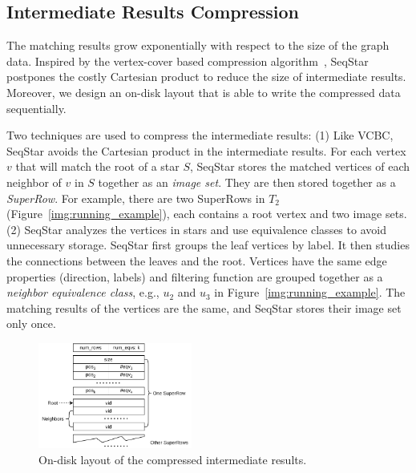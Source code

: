 \subsection{Intermediate Results Compression}\label{sec:match_compress}
The matching results grow exponentially with respect to the size of the graph data.
Inspired by the vertex-cover based compression algorithm~\cite{DBLP:journals/pvldb/QiaoZC17},
SeqStar postpones the costly Cartesian product to reduce the size of intermediate results.
Moreover, we design an on-disk layout that is able to write the compressed data sequentially.

Two techniques are used to compress the intermediate results:
(1) Like VCBC, SeqStar avoids the Cartesian product in the intermediate results.
For each vertex $v$ that will match the root of a star $S$,
SeqStar stores the matched vertices of each neighbor of $v$ in $S$ together as an \emph{image set}.
They are then stored together as a \emph{SuperRow}.
For example, there are two SuperRows in $T_2$ (Figure~\ref{img:running_example}),
each contains a root vertex and two image sets.
(2) SeqStar analyzes the vertices in stars and use equivalence classes to avoid unnecessary storage.
SeqStar first groups the leaf vertices by label.
It then studies the connections between the leaves and the root.
Vertices have the same edge properties (direction, labels) and filtering function are grouped together as a \emph{neighbor equivalence class},
e.g., $u_2$ and $u_3$ in Figure~\ref{img:running_example}.
The matching results of the vertices are the same, and SeqStar stores their image set only once.

\begin{figure}[ht]
  \centering
  \includegraphics[width=0.45\textwidth]{img/compress.pdf}
  \caption{On-disk layout of the compressed intermediate results.}\label{img:compress}
\end{figure}

